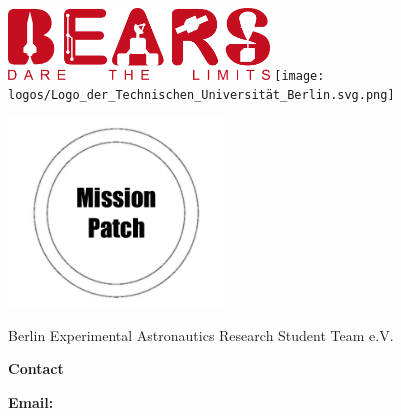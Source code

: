 \begin{titlepage}
    \begin{center}
    \includegraphics[height=1.9cm]{logos/BEARS_writing_with_motto.png}
    \hspace{5cm}
    \texttt{[image: logos/Logo\_der\_Technischen\_Universität\_Berlin.svg.png]}
    \par\vspace{2cm}
    \includegraphics[height=5cm]{logos/mission_patch.png}
    \par\vspace{2cm}

    {\Large Berlin Experimental Astronautics Research Student Team e.V. \par}
    \vspace{0.5cm}
    {\Large \projectname \par}
    \vspace{2cm}
    {\LARGE \textbf{\titlename} \par}
    \vspace{0.5cm}
    {\large \subtitlename \par}
    \vspace{0.5cm}
    \vspace{2cm}

    \end{center}

    \vfill
    {\large \textbf{Contact} \par}
    \vspace{0.5cm}
    
    \contactname
    
    \textbf{Email:} \contactemail

    \vspace{1cm}
    

\end{titlepage}
